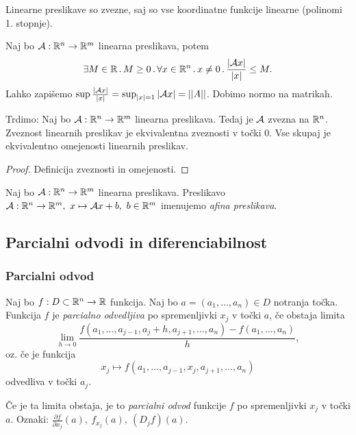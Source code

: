 \begin{opomba}
    Linearne preslikave so zvezne, saj so vse koordinatne funkcije linearne (polinomi 1. stopnje).
\end{opomba}

\begin{zgled}
    Naj bo $\mathcal{A}: \mathbb{R}^n \to \mathbb{R}^m$ linearna preslikava, potem $$\exists  M \in \mathbb{R} \, . \, M \geq 0 \,.\, \forall x \in \mathbb{R}^n \, . \, x \neq 0  \,.\,  \frac{|\mathcal{A}x|}{|x|} \leq M.$$
    Lahko zapišemo $\sup \frac{|\mathcal{A}x|}{|x|} = \sup_{|x|=1}|\mathcal{A}x| = ||A||$. Dobimo normo na matrikah.

    Trdimo: Naj bo $\mathcal{A}: \mathbb{R}^n \to \mathbb{R}^m$ linearna preslikava. Tedaj je $\mathcal{A}$ zvezna na $\mathbb{R}^n$. Zveznost linearnih preslikav je ekvivalentna zveznosti v točki $0$. Vse skupaj je ekvivalentno omejenosti linearnih preslikav.
\end{zgled}

\begin{proof}
    Definicija zveznosti in omejenosti.
\end{proof}

\begin{definicija}
    Naj bo $\mathcal{A}: \mathbb{R}^n \to \mathbb{R}^m$ linearna preslikava. Preslikavo $\mathcal{A}: \mathbb{R}^n \to \mathbb{R}^m, \ x \mapsto \mathcal{A}x + b, \ b \in \mathbb{R}^m$ imenujemo \emph{afina preslikava}.
\end{definicija}

\subsection{Parcialni odvodi in diferenciabilnost}
\subsubsection{Parcialni odvod}
\begin{definicija}
    Naj bo $f: D \subset \mathbb{R}^n \to \mathbb{R}$ funkcija. Naj bo $a = (a_1, \ldots, a_n) \in D$ notranja točka. Funkcija $f$ je \emph{parcialno odvedljiva} po spremenljivki $x_j$ v točki $a$, če obstaja limita 
    $$\lim_{h \to 0} \frac{f(a_1, \ldots, a_{j-1}, a_j+h, a_{j+1}, \ldots, a_n) - f(a_1, \ldots, a_n)}{h},$$
    oz. če je funkcija 
    $$x_j \mapsto f(a_1, \ldots, a_{j-1}, x_j, a_{j+1}, \ldots, a_n)$$
    odvedliva v točki $a_j$.

    Če je ta limita obstaja, je to \emph{parcialni odvod} funkcije $f$ po spremenljivki $x_j$ v točki $a$.
    Oznaki: $\frac{\partial f}{\partial x_j}(a), \ f_{x_j}(a), \ (D_jf)(a)$.
\end{definicija}

